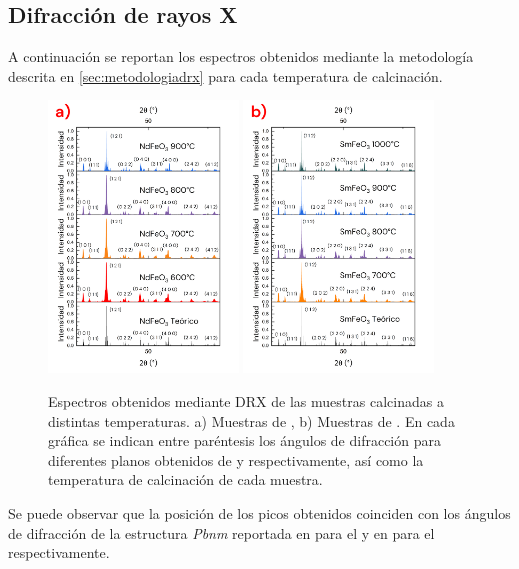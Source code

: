 \documentclass[../main.tex]{subfiles}
\begin{document}
\subsection{Difracción de rayos X} \label{sec:analisisDRX}
A continuación se reportan los espectros obtenidos mediante la metodología descrita en \ref{sec:metodologiadrx} para cada temperatura de calcinación.
\begin{figure}[H]
    \centering
    \includegraphics[width=0.45\textwidth]{fig/drxtempndfeo3.png}
    \quad
    \includegraphics[width=0.45\textwidth]{fig/drxtempsmfeo3.png}
    \caption{Espectros obtenidos mediante DRX de las muestras calcinadas a distintas temperaturas. a) Muestras de \neod{}, b) Muestras de \sama{}. En cada gráfica se indican entre paréntesis los ángulos de difracción para diferentes planos obtenidos de \cite{ndfeo3} y \cite{smfeo3} respectivamente, así como la temperatura de calcinación de cada muestra.}
    \label{fig:drxtempcomp}
\end{figure}
Se puede observar que la posición de los picos obtenidos coinciden con los ángulos de difracción  de la estructura \textit{Pbnm} reportada en \cite{ndfeo3} para el \neod{} y en \cite{smfeo3} para el \sama{} respectivamente.
\end{document}
